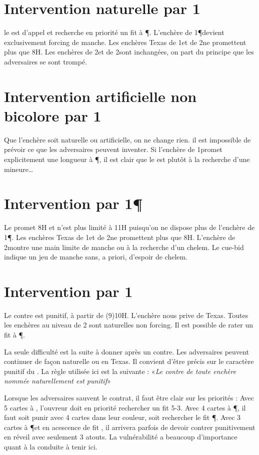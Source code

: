 \begin{multicols}{2}
\section*{Intervention naturelle par 1\C}
le \Double est d'appel et recherche en priorité un fit à \P. L'enchère de 1\P devient exclusivement forcing de manche. Les enchères Texas de 1\NT et de 2\T ne promettent plus que 8H.
Les enchères de 2\K et de 2\C sont inchangées, on part du principe que les adversaires se sont trompé.

\section*{Intervention artificielle non bicolore par 1\C}
Que l'enchère soit naturelle ou artificielle, on ne change rien. il est impossible de prévoir ce que les adversaires peuvent inventer.
Si l'enchère de 1\C promet explicitement une longueur à \P, il est clair que le \Double est plutôt à la recherche d'une mineure\dots

\section*{Intervention par 1\P}
Le \Double promet 8H et n'est plus limité à 11H puisqu'on ne dispose plus de l'enchère de 1\P. Les enchères Texas de 1\NT et de 2\T ne promettent plus que 8H.
L'enchère de 2\K montre une main limite de manche ou à la recherche d'un chelem. Le cue-bid indique un jeu de manche sans, a priori, d'espoir de chelem.

\section*{Intervention par 1\NT}

Le contre est punitif, à partir de (9)10H. L'enchère nous prive de Texas. Toutes les enchères au niveau de 2 sont naturelles non forcing. Il est possible de rater un fit à \P.

La seule difficulté est la suite à donner après un contre. Les adversaires peuvent continuer de façon naturelle ou en Texas. Il convient d'être précis sur le caractère punitif du \Double.
La règle utilisée ici est la suivante : «\textit{Le contre de toute enchère nommée naturellement est punitif}»

Lorsque les adversaires sauvent le contrat, il faut être clair sur les priorités : Avec 5 cartes à \C, l'ouvreur doit en priorité rechercher un fit 5-3. Avec 4 cartes à \P, il faut soit punir avec 4 cartes dans leur couleur, soit rechercher le fit \P. Avec 3 cartes à \P et en acescence de fit \C, il arrivera parfois de devoir contrer punitivement en réveil avec seulement 3 atouts. La vulnérabilité a beaucoup d'importance quant à la conduite à tenir ici.




\end{multicols}
